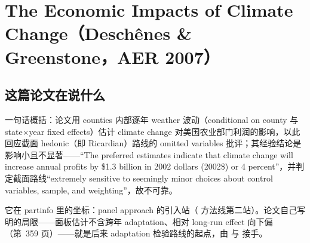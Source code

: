 
\chapter{The Economic Impacts of Climate Change（Deschênes \& Greenstone，AER 2007）}
\label{ch:deschenes-greenstone-2007}

\section{这篇论文在说什么}

一句话概括：论文用 counties 内部逐年 weather 波动（conditional on county 与 state$\times$year fixed effects）估计 climate change 对美国农业部门利润的影响，以此回应截面 hedonic（即 Ricardian）路线的 omitted variables 批评；其经验结论是影响小且不显著——``The preferred estimates indicate that climate change will increase annual profits by \$1.3 billion in 2002 dollars (2002\$) or 4 percent''\citep[第~354 页]{deschenes2007economic}，并判定截面路线``extremely sensitive to seemingly minor choices about control variables, sample, and weighting''\citep[第~354 页]{deschenes2007economic}，故不可靠。

它在 partinfo 里的坐标：panel approach 的引入站（ 方法线第二站）。论文自己写明的局限——面板估计不含跨年 adaptation、相对 long-run effect 向下偏（第~359 页）——就是后来 adaptation 检验路线的起点，由  与  接手。

